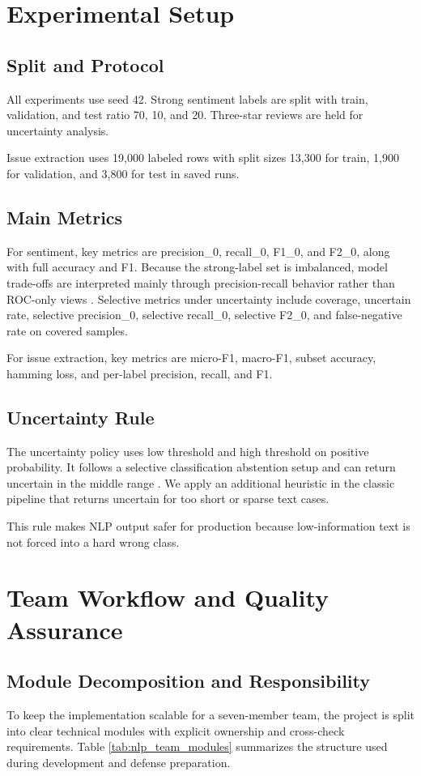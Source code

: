 \documentclass[12pt,a4paper]{article}
\begin{document}
\section{Experimental Setup}
\subsection{Split and Protocol}
All experiments use seed 42. Strong sentiment labels are split with train, validation, and test ratio 70, 10, and 20. Three-star reviews are held for uncertainty analysis.

Issue extraction uses 19,000 labeled rows with split sizes 13,300 for train, 1,900 for validation, and 3,800 for test in saved runs.

\subsection{Main Metrics}
For sentiment, key metrics are precision\_0, recall\_0, F1\_0, and F2\_0, along with full accuracy and F1. Because the strong-label set is imbalanced, model trade-offs are interpreted mainly through precision-recall behavior rather than ROC-only views \cite{saito2015}. Selective metrics under uncertainty include coverage, uncertain rate, selective precision\_0, selective recall\_0, selective F2\_0, and false-negative rate on covered samples.

For issue extraction, key metrics are micro-F1, macro-F1, subset accuracy, hamming loss, and per-label precision, recall, and F1.

\subsection{Uncertainty Rule}
The uncertainty policy uses low threshold and high threshold on positive probability. It follows a selective classification abstention setup and can return uncertain in the middle range \cite{geifman2017}. We apply an additional heuristic in the classic pipeline that returns uncertain for too short or sparse text cases.

This rule makes NLP output safer for production because low-information text is not forced into a hard wrong class.

\section{Team Workflow and Quality Assurance}
\subsection{Module Decomposition and Responsibility}
To keep the implementation scalable for a seven-member team, the project is split into clear technical modules with explicit ownership and cross-check requirements. Table \ref{tab:nlp_team_modules} summarizes the structure used during development and defense preparation.
\end{document}
